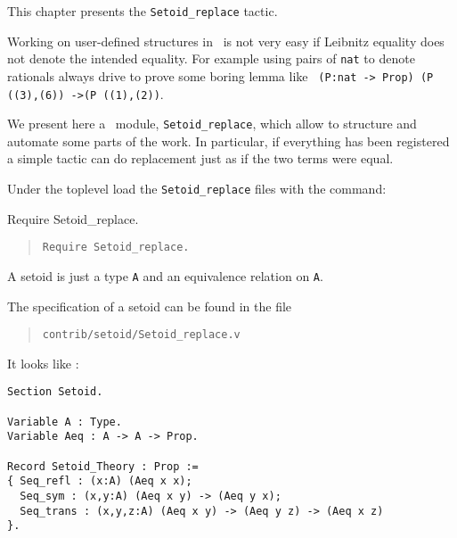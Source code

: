 \label{Setoid_replace}

This chapter presents  the \texttt{Setoid\_replace} tactic.


Working on user-defined structures in \Coq\ is not very easy if
Leibnitz equality does not denote the intended equality. For example
using pairs of \verb|nat| to denote rationals always drive to prove
some boring lemma like
\verb| (P:nat -> Prop) (P ((3),(6)) ->(P ((1),(2))|.

We present here a \Coq\ module, {\tt Setoid\_replace}, which allow to
structure and automate some parts of the work. In particular, if
everything has been registered a simple
tactic can do replacement just as if the two terms were equal.


Under the toplevel
load the \texttt{Setoid\_replace} files with the command:

\begin{coq_eval}
  Require Setoid_replace.
\end{coq_eval}

\begin{quotation}
\begin{verbatim}
Require Setoid_replace.
\end{verbatim}
\end{quotation}

A setoid is just a type \verb+A+ and an equivalence relation on \verb+A+.

The specification of a setoid can be found in the file

\begin{quotation}
\begin{verbatim}
contrib/setoid/Setoid_replace.v
\end{verbatim}
\end{quotation}

It looks like :
\begin{small}
\begin{flushleft}
\begin{verbatim}
Section Setoid.

Variable A : Type.
Variable Aeq : A -> A -> Prop.

Record Setoid_Theory : Prop :=
{ Seq_refl : (x:A) (Aeq x x);
  Seq_sym : (x,y:A) (Aeq x y) -> (Aeq y x);
  Seq_trans : (x,y,z:A) (Aeq x y) -> (Aeq y z) -> (Aeq x z)
}.
\end{verbatim}
\end{flushleft}
\end{small}

